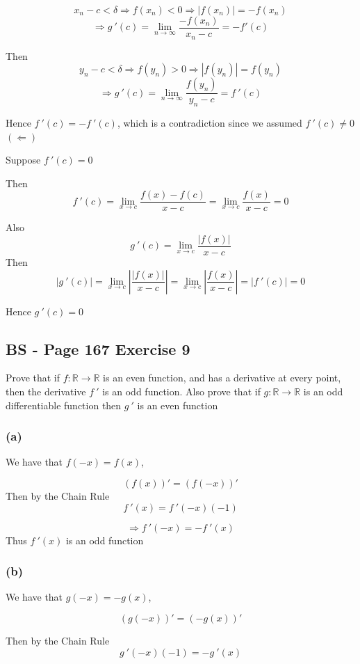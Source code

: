 \documentclass{article}
\begin{document}
\[
x_n - c < \delta \Rightarrow f(x_n) < 0 \Rightarrow |f(x_n)| = - f(x_n)
\]
\[
\Rightarrow g \ ' (c) = \lim_{n\to \infty}{\frac{-f(x_n)}{x_n - c}} = - f ' (c)
\]

Then
\[
y_n - c < \delta \Rightarrow f(y_n) > 0 \Rightarrow |f(y_n)| =  f(y_n)
\]
\[
\Rightarrow g \ ' (c) = \lim_{n\to \infty}{\frac{f(y_n)}{y_n - c}} = f \ ' (c)
\]

Hence \(f \ '(c) = - f \ ' (c)\), which is a contradiction since we assumed \(f \ ' (c) \neq 0\)
\\

\((\Leftarrow)\)

Suppose \(f \ '(c) = 0\)

Then
\[
f \ ' (c) = \lim_{x\to c}{\frac{f(x)- f(c)}{x-c}} = \lim_{x\to c}{\frac{f(x)}{x-c}} = 0
\]

Also 
\[
g \ ' (c) = \lim_{x\to c}{\frac{|f(x)|}{x-c}}
\]
Then
\[
|g \ ' (c)| = \lim_{x\to c}{\left|\frac{|f(x)|}{x-c}\right|}=\lim_{x\to c}{\left|\frac{f(x)}{x-c}\right|} = |f \ ' (c)| = 0
\]

Hence \(g \ ' (c) = 0\)

\subsection*{BS - Page 167 Exercise 9}
Prove that if \(f:\mathbb{R} \rightarrow \mathbb{R}\) is an even function, and has a derivative at every point, then the derivative
\(f \ '\) is an odd function. Also prove that if \(g: \mathbb{R} \rightarrow \mathbb{R}\) is an odd differentiable function then
\(g \ '\) is an even function 
\\

\subsubsection*{(a)}
We have that \(f(-x) = f(x)\),

\[
(f(x))' = (f(-x))' 
\]
Then by the Chain Rule
\[
f \ ' (x) = f \ ' (-x)(-1) 
\]

\[
\Rightarrow f \ ' (-x) = - f \ ' (x)
\]
Thus \(f \ ' (x)\) is an odd function

\subsubsection*{(b)}
We have that \(g(-x) = -g(x)\),

\[
(g(-x))' = (-g(x))'
\]

Then by the Chain Rule
\[
g \ '(-x) (-1) = -g \ ' (x)
\]
\end{document}
